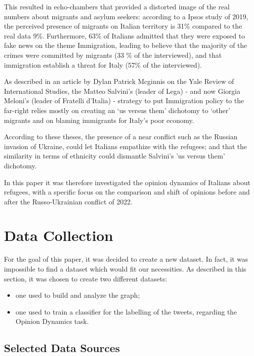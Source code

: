 \documentclass[sigchi]{acmart}
\begin{document}
This resulted in echo-chambers that provided a distorted image of the real numbers about migrants and asylum seekers: according to a Ipsos study of 2019, the perceived presence of migrants on Italian territory is 31\% compared to the real data 9\%\cite{ipsos}. Furthermore, 63\% of Italians admitted that they were exposed to fake news on the theme Immigration, leading to believe that the majority of the crimes were committed by migrants (33 \% of the interviewed\cite{ipsos}), and that immigration establish a threat for Italy (57\% of the interviewed\cite{ipsos}).

As described in an article by Dylan Patrick Mcginnis on the Yale Review of International Studies\cite{salvinistrategy}, the Matteo Salvini's (leader of Lega) - and now Giorgia Meloni's (leader of Fratelli d'Italia) - strategy to put Immigration policy to the far-right relies mostly on creating an ‘us versus them’ dichotomy to ‘other’ migrants and on blaming immigrants for Italy’s poor economy.

According to these theses, the presence of a near conflict such as the Russian invasion of Ukraine, could let Italians empathize with the refugees; and that the similarity in terms of ethnicity could dismantle Salvini's 'us versus them' dichotomy.

In this paper it was therefore investigated the opinion dynamics of Italians about refugees, with a specific focus on the comparison and shift of opinions before and after the Russo-Ukrainian conflict of 2022.


\section{Data Collection}
For the goal of this paper, it was decided to create a new dataset. In fact, it was impossible to find a dataset which would fit our necessities. As described in this section, it was chosen to create two different datasets:
\begin{itemize}
    \item one used to build and analyze the graph;
    \item one used to train a classifier for the labelling of the tweets, regarding the Opinion Dynamics task.
\end{itemize}

\subsection{Selected Data Sources}
\end{document}
